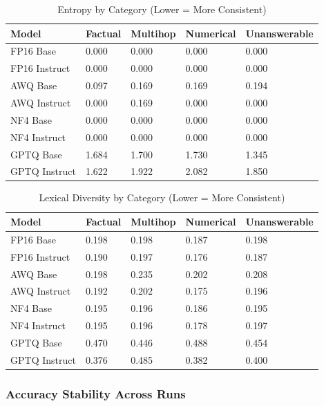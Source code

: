 \documentclass[11pt,a4paper]{article}
\begin{document}
\begin{table}[H]
\centering
\caption{Entropy by Category (Lower = More Consistent)}
\small
\begin{tabularx}{\textwidth}{@{}X C{2cm} C{2cm} C{2cm} C{2cm}@{}}
\toprule
\textbf{Model} & \textbf{Factual} & \textbf{Multihop} & \textbf{Numerical} & \textbf{Unanswerable} \\
\midrule
FP16 Base & 0.000 & 0.000 & 0.000 & 0.000 \\
FP16 Instruct & 0.000 & 0.000 & 0.000 & 0.000 \\
AWQ Base & 0.097 & 0.169 & 0.169 & 0.194 \\
AWQ Instruct & 0.000 & 0.169 & 0.000 & 0.000 \\
NF4 Base & 0.000 & 0.000 & 0.000 & 0.000 \\
NF4 Instruct & 0.000 & 0.000 & 0.000 & 0.000 \\
GPTQ Base & 1.684 & 1.700 & 1.730 & 1.345 \\
GPTQ Instruct & 1.622 & 1.922 & 2.082 & 1.850 \\
\bottomrule
\end{tabularx}
\end{table}

\begin{table}[H]
\centering
\caption{Lexical Diversity by Category (Lower = More Consistent)}
\small
\begin{tabularx}{\textwidth}{@{}X C{2cm} C{2cm} C{2cm} C{2cm}@{}}
\toprule
\textbf{Model} & \textbf{Factual} & \textbf{Multihop} & \textbf{Numerical} & \textbf{Unanswerable} \\
\midrule
FP16 Base & 0.198 & 0.198 & 0.187 & 0.198 \\
FP16 Instruct & 0.190 & 0.197 & 0.176 & 0.187 \\
AWQ Base & 0.198 & 0.235 & 0.202 & 0.208 \\
AWQ Instruct & 0.192 & 0.202 & 0.175 & 0.196 \\
NF4 Base & 0.195 & 0.196 & 0.186 & 0.195 \\
NF4 Instruct & 0.195 & 0.196 & 0.178 & 0.197 \\
GPTQ Base & 0.470 & 0.446 & 0.488 & 0.454 \\
GPTQ Instruct & 0.376 & 0.485 & 0.382 & 0.400 \\
\bottomrule
\end{tabularx}
\end{table}

\subsubsection{Accuracy Stability Across Runs}
\end{document}
